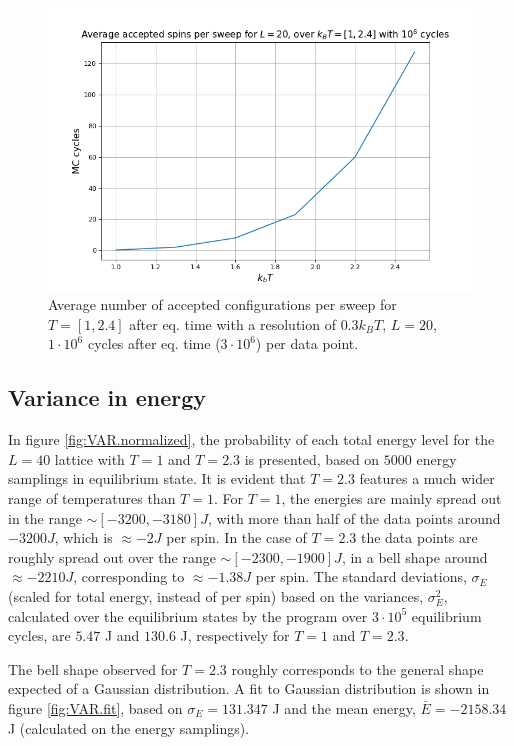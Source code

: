 \documentclass[%
oneside,                 %
final,                   %
10pt]{article}
\begin{document}
\begin{figure}[!htb]
        \centering 
         \includegraphics[scale=.40]{../Results/configs_temperature.png} 
        \caption{Average number of accepted configurations per sweep for $T=[1,2.4]$ after eq. time with a resolution of $0.3 k_B T$, $L=20$, $1 \cdot 10^6$ cycles after eq. time ($3 \cdot 10^6$) per data point.}
        \label{fig:SPIN.configs.temp}   
\end{figure} 

\subsection{Variance in energy}
\label{SS:results.VAR }
In figure \ref{fig:VAR.normalized}, the probability of each total energy level for the $L=40$ lattice with $T=1$ and $T=2.3$ is presented, based on $5000$ energy samplings in equilibrium state. It is evident that  $T=2.3$ features a much wider range of temperatures than $T=1$. For $T=1$, the energies are mainly spread out in the range $\sim [-3200,-3180] J$, with more than half of the data points around $-3200 J$, which is $\approx -2J$ per spin. In the case of $T=2.3$ the data points are roughly spread out over the range $\sim [-2300,-1900]J$, in a bell shape around $\approx -2210J$, corresponding to $\approx -1.38J$ per spin. The standard deviations, $\sigma_E$ (scaled for total energy, instead of per spin) based on the variances, $\sigma_E^2$, calculated over the equilibrium states by the program over $3 \cdot 10^5$ equilibrium cycles, are $5.47$ J and $130.6$ J, respectively for $T=1$ and $T=2.3$. \newline

The bell shape observed for $T=2.3$ roughly corresponds to the general shape expected of a Gaussian distribution. A fit to Gaussian distribution is shown in figure \ref{fig:VAR.fit}, based on $\sigma_E=131.347$ J and the mean energy, $\bar{E}=-2158.34$ J (calculated on the energy samplings). \newline
\end{document}
